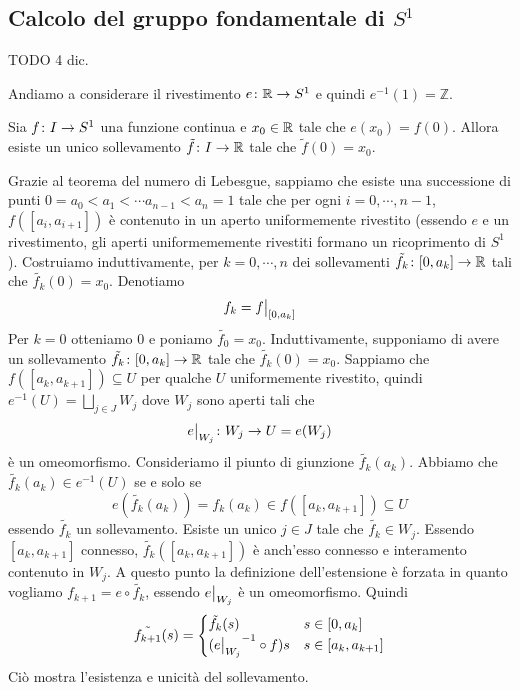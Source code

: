 \documentclass[a4paper]{article}
\begin{document}
\subsection{Calcolo del gruppo fondamentale di \(S^1\)}

TODO 4 dic.

Andiamo a considerare il rivestimento \(e \colon \mathbb{R} \to S^1\)
e quindi \(e^{-1}(1) = \mathbb{Z}\).

\begin{snippetproposition}{}
    Sia \(f \colon I \to S^1\) una funzione continua e
    \(x_0 \in \mathbb{R}\) tale che \(e(x_0) = f(0)\).
    Allora esiste un unico sollevamento \(\tilde f \colon I \to \mathbb{R}\)
    tale che \(\tilde f(0) = x_0\).
\end{snippetproposition}

\begin{snippetproof}{}
    Grazie al teorema del numero di Lebesgue,
    sappiamo che esiste una successione di punti
    \(0 = a_0 < a_1 < \cdots a_{n-1} < a_n = 1\)
    tale che per ogni \(i = 0, \cdots, n-1\), \(f([a_i, a_{i+1}])\) è contenuto
    in un aperto uniformemente rivestito (essendo \(e\) e un rivestimento,
    gli aperti uniformememente rivestiti formano un ricoprimento di \(S^1\)).
    Costruiamo induttivamente,
    per \(k=0, \cdots, n\) dei sollevamenti
    \(\tilde{f_k} \colon [0, a_k] \to \mathbb{R}\)
    tali che \(\tilde{f_k}(0) = x_0\).
    Denotiamo
    \[
        f_k = \restr{f}{[0,a_k]}
    \]
    Per \(k=0\) otteniamo \({0}\)
    e poniamo \(\tilde{f_0} = x_0\).
    Induttivamente, supponiamo di avere un sollevamento
    \(\tilde{f_k} \colon [0, a_k] \to \mathbb{R}\)
    tale che \(\tilde{f_k}(0) = x_0\).
    Sappiamo che \(f([a_k, a_{k+1}]) \subseteq U\) per qualche \(U\)
    uniformemente rivestito, quindi \(e^{-1}(U) = \bigsqcup_{j\in J} W_j\)
    dove \(W_j\) sono aperti tali che
    \[
        \restr{e}{W_j} \colon W_j \fromto U = e(W_j)
    \]
    è un omeomorfismo.
    Consideriamo il piunto di giunzione \(\tilde{f_k}(a_k)\).
    Abbiamo che \(\tilde{f_k}(a_k) \in e^{-1}(U)\)
    se e solo se \[
        e(\tilde{f_k}(a_k))
        = f_k(a_k) \in f([a_k, a_{k+1}]) \subseteq U
    \]
    essendo \(\tilde{f_k}\) un sollevamento.
    Esiste un unico \(j \in J\) tale che \(\tilde{f_k} \in W_j\).
    Essendo \([a_k, a_{k+1}]\) connesso, \(\tilde{f_k}([a_k, a_{k+1}])\)
    è anch'esso connesso e interamento contenuto in \(W_j\).
    A questo punto la definizione dell'estensione è forzata
    in quanto vogliamo \(f_{k+1} = e\circ \tilde{f_k}\),
    essendo \(\restr{e}{W_j}\) è un omeomorfismo. Quindi
    \[
        \tilde{f_{k+1}}(s) = \begin{cases}
            \tilde{f_k}(s) & s \in [0, a_k] \\
            (\restr{e}{W_j}^{-1} \circ f)s & s \in [a_k, a_{k+1}]
        \end{cases}
    \]
    Ciò mostra l'esistenza e unicità del sollevamento.
\end{snippetproof}
\end{document}
